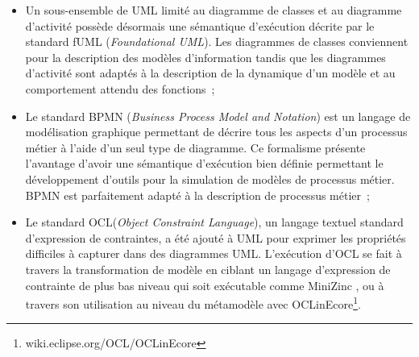 \begin{itemize}

\item Un sous-ensemble de UML limité au diagramme de classes et au diagramme d'activité possède désormais une sémantique d'exécution décrite par le standard fUML (\textit{Foundational UML}). Les diagrammes de classes conviennent pour la description des modèles d'information tandis que les diagrammes d'activité sont adaptés à la description de la dynamique d'un modèle et au comportement attendu des fonctions~;

\item Le standard BPMN (\textit{Business Process Model and Notation}) est un langage de modélisation graphique permettant de décrire tous les aspects d'un processus métier à l'aide d'un seul type de diagramme. Ce formalisme présente l'avantage d'avoir une sémantique d'exécution bien définie permettant le développement d'outils pour la simulation de modèles de processus métier. BPMN est parfaitement adapté à la description de processus métier~;
\item Le standard OCL(\textit{Object Constraint Language}), un langage textuel standard d'expression de contraintes, a été ajouté à UML pour exprimer les propriétés difficiles à capturer dans des diagrammes UML. L'exécution d'OCL se fait à travers la transformation de modèle en ciblant un langage d'expression de contrainte de plus bas niveau qui soit exécutable comme MiniZinc \cite{nethercote2007minizinc}, ou à travers son utilisation au niveau du métamodèle avec OCLinEcore\footnote{wiki.eclipse.org/OCL/OCLinEcore}.

\end{itemize}










